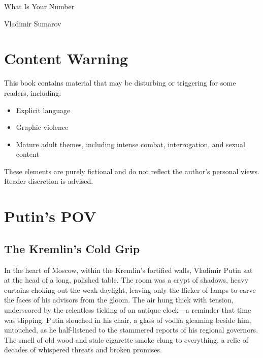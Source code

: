 \documentclass[12pt]{book}
\begin{document}
\begin{titlepage}
    \centering
    \vspace*{3cm}
    {\fontsize{48}{60}\selectfont What Is Your Number\par} %
    \vspace{2cm}
    {\Large Vladimir Sumarov\par} %
\end{titlepage}
\clearpage

\chapter*{Content Warning}
This book contains material that may be disturbing or triggering for some readers, including:
\begin{itemize}
    \item Explicit language
    \item Graphic violence
    \item Mature adult themes, including intense combat, interrogation, and sexual content
\end{itemize}
These elements are purely fictional and do not reflect the author’s personal views. Reader discretion is advised.
\clearpage

\tableofcontents
\clearpage

\chapter{Putin's POV}

\section{The Kremlin's Cold Grip}

In the heart of Moscow, within the Kremlin's fortified walls, Vladimir Putin sat at the head of a long, polished table. The room was a crypt of shadows, heavy curtains choking out the weak daylight, leaving only the flicker of lamps to carve the faces of his advisors from the gloom. The air hung thick with tension, underscored by the relentless ticking of an antique clock---a reminder that time was slipping. Putin slouched in his chair, a glass of vodka gleaming beside him, untouched, as he half-listened to the stammered reports of his regional governors. The smell of old wood and stale cigarette smoke clung to everything, a relic of decades of whispered threats and broken promises.
\end{document}
